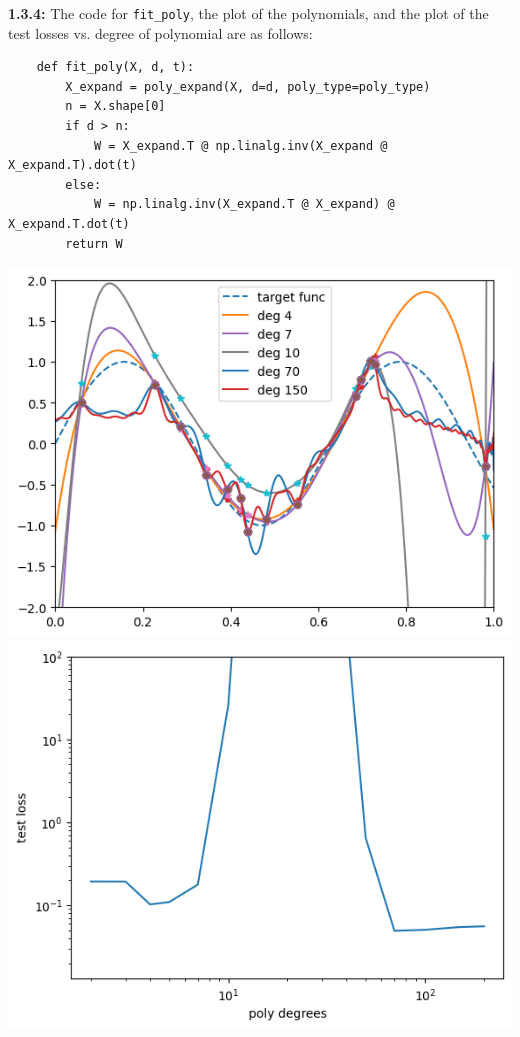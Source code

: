 \documentclass[12pt]{article}
\begin{document}
\textbf{1.3.4:} The code for \verb|fit_poly|, the plot of the polynomials, and the plot of the test losses vs. degree of polynomial are as follows:
\begin{verbatim}
    def fit_poly(X, d, t):
        X_expand = poly_expand(X, d=d, poly_type=poly_type)
        n = X.shape[0]
        if d > n:
            W = X_expand.T @ np.linalg.inv(X_expand @ X_expand.T).dot(t)
        else:
            W = np.linalg.inv(X_expand.T @ X_expand) @ X_expand.T.dot(t)
        return W
\end{verbatim}
\begin{center}
\includegraphics[scale=.75]{1.3.4_poly.png}
\includegraphics[scale=.75]{1.3.4_loss.png}\end{center}
\end{document}

